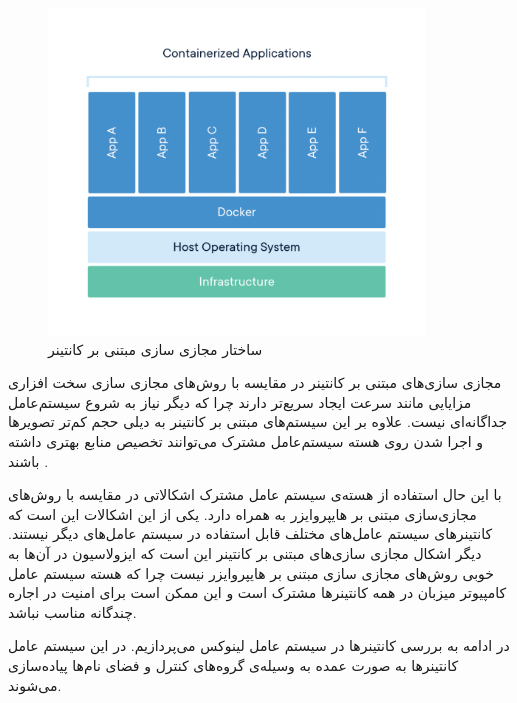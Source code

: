     \begin{figure}[]
      \centerline{\includegraphics[width=10cm]{graphics/chapter_2/container}}
      \caption{ساختار مجازی سازی مبتنی بر کانتینر \cite{2018are}}
      \label{fig:chapter_2:container}
    \end{figure}
    
    مجازی سازی‌های مبتنی بر کانتینر در مقایسه با روش‌های مجازی سازی سخت افزاری مزایایی مانند سرعت ایجاد سریع‌تر دارند چرا که دیگر نیاز به شروع سیستم‌عامل جداگانه‌ای نیست.
    علاوه بر این سیستم‌های مبتنی بر کانتینر به دیلی حجم کم‌تر  تصویر‌ها و اجرا شدن روی هسته سیستم‌عامل مشترک می‌توانند تخصیص منابع بهتری داشته باشند \cite{morabito2015hypervisors}.

    با این حال استفاده از هسته‌ی سیستم عامل مشترک اشکالاتی در مقایسه با روش‌های مجازی‌سازی مبتنی بر {هایپروایزر} به همراه دارد.
    یکی از این اشکالات این است که کانتینر‌های سیستم عامل‌های مختلف قابل استفاده در سیستم عامل‌های دیگر نیستند.
    دیگر اشکال مجازی سازی‌های مبتنی بر کانتینر این است که ایزولاسیون در آن‌ها به خوبی روش‌های مجازی سازی مبتنی بر {هایپروایزر} نیست \cite{bui2015analysis} چرا که هسته سیستم عامل کامپیوتر میزبان در همه کانتینر‌ها مشترک است و این ممکن است برای امنیت در اجاره چندگانه مناسب نباشد.

    در ادامه به بررسی کانتینر‌ها در سیستم عامل لینوکس می‌پردازیم.
    در این سیستم عامل کانتینر‌ها به صورت عمده به وسیله‌ی گروه‌های کنترل\cite{tejun2015Linux} و فضای نام‌ها\cite{2015Linux} پیاده‌سازی می‌شوند.

